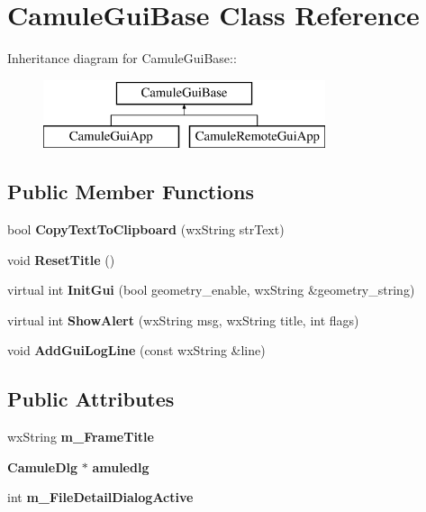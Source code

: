 \section{CamuleGuiBase Class Reference}
\label{classCamuleGuiBase}
Inheritance diagram for CamuleGuiBase::\begin{figure}[H]
\begin{center}
\leavevmode
\includegraphics[height=2cm]{classCamuleGuiBase}
\end{center}
\end{figure}
\subsection*{Public Member Functions}
\begin{DoxyCompactItemize}
\item 
bool {\bfseries CopyTextToClipboard} (wxString strText)\label{classCamuleGuiBase_a3f1cfc74de12cdb8d641f12882b1df15}

\item 
void {\bfseries ResetTitle} ()\label{classCamuleGuiBase_a939ad22323fa757c3c83a70dd2fe4fcc}

\item 
virtual int {\bfseries InitGui} (bool geometry\_\-enable, wxString \&geometry\_\-string)\label{classCamuleGuiBase_aec85607ff17b3f9210c6060b8ff3e9e2}

\item 
virtual int {\bfseries ShowAlert} (wxString msg, wxString title, int flags)\label{classCamuleGuiBase_a32f07e46167bb221243c52de935cd766}

\item 
void {\bfseries AddGuiLogLine} (const wxString \&line)\label{classCamuleGuiBase_a993802d6b510402a77c596ea7c63cd93}

\end{DoxyCompactItemize}
\subsection*{Public Attributes}
\begin{DoxyCompactItemize}
\item 
wxString {\bfseries m\_\-FrameTitle}\label{classCamuleGuiBase_a78aca7f642040bfc12b4657493138d88}

\item 
{\bf CamuleDlg} $\ast$ {\bfseries amuledlg}\label{classCamuleGuiBase_a53452287adfd7b78aaa035da60c92623}

\item 
int {\bfseries m\_\-FileDetailDialogActive}\label{classCamuleGuiBase_a50dc377107816abffe6a32916d6bec81}

\end{DoxyCompactItemize}
